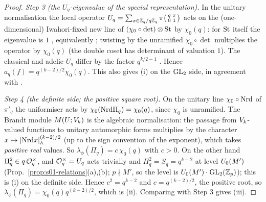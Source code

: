 \begin{proof}
\emph{Step 3 (the $U_q$-eigenvalue of the special representation).} In the unitary normalisation the local operator
$U_q=\sum_{x\in\mathbb{Z}_q/q\mathbb{Z}_q}\pi\big(\begin{smallmatrix}q&x\\0&1\end{smallmatrix}\big)$ acts on the (one-dimensional) Iwahori-fixed new
line of $(\chi_0\circ\det)\otimes\mathrm{St}$ by $\chi_0(q)$: for $\mathrm{St}$ itself the eigenvalue is $1$
, equivalently
; twisting by the unramified $\chi_0\circ\det$ multiplies the
operator by $\chi_0(q)$ (the double coset has determinant of valuation $1$). The classical and adelic $U_q$ differ by the
factor $q^{k/2-1}$ . Hence
$a_q(f)=q^{(k-2)/2}\chi_0(q)$. This also gives (i) on the $\mathrm{GL}_2$ side, in agreement with
.

\emph{Step 4 (the definite side; the positive square root).} On the unitary line $\chi_0\circ\mathrm{Nrd}$ of $\pi'_q$ the uniformiser
acts by $\chi_0(\mathrm{Nrd}\Pi_q)=\chi_0(q)$, since $\chi_0$ is unramified. The Brandt module $M(U;V_k)$ is the algebraic
normalisation: the passage from $V_k$-valued functions to unitary automorphic forms multiplies by the character
$x\mapsto|\mathrm{Nrd} x|_{\mathbb{A}}^{(k-2)/2}$ (up to the sign convention of the exponent), which takes \emph{positive real} values. So
$\lambda_\phi(\Pi_q)=c\,\chi_0(q)$ with $c>0$. On the other hand $\Pi_q^2\in q\,\mathcal{O}_q^\times$, and $\mathcal{O}_q^\times=U_q$ acts trivially
and $\Pi_q^2=S_q=q^{k-2}$ at level $U_0(M')$ (Prop.~\ref{prop:s01-relations}(a),(b); $p\nmid M'$, so the level is
$U_0(M')\cdot\mathrm{GL}_2(\mathbb{Z}_p)$); this is (i) on the definite side. Hence $c^2=q^{k-2}$ and $c=q^{(k-2)/2}$, the positive root, so
$\lambda_\phi(\Pi_q)=\chi_0(q)q^{(k-2)/2}$, which is (ii). Comparing with Step 3 gives (iii).
\end{proof}

